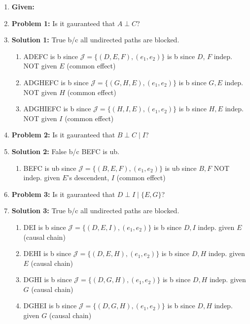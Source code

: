 \begin{example}
    \begin{enumerate}
        \item \textbf{Given:}
        \item \textbf{Problem 1:} Is it gauranteed that $A \perp C$?
        \item \textbf{Solution 1:} True b/c all undirected paths are blocked.
        \begin{enumerate}
            \item ADEFC is b since $\mathcal{J} = \{(D,E,F),(e_1,e_2)\}$ is b since $D$, $F$ indep. NOT given $E$ (common effect)
            \item ADGHEFC is b since $\mathcal{J} = \{(G,H,E),(e_1,e_2)\}$ is b since $G,E$ indep. NOT given $H$ (common effect)
            \item ADGHIEFC is b since $\mathcal{J} = \{(H,I,E),(e_1,e_2)\}$ is b since $H,E$ indep. NOT given $I$ (common effect)
        \end{enumerate}
        \item \textbf{Problem 2:} Is it gauranteed that $B \perp C \mid I$?
        \item \textbf{Solution 2:} False b/c BEFC is ub. 
        \begin{enumerate}
            \item BEFC is ub since $\mathcal{J} = \{(B,E,F),(e_1,e_2)\}$ is ub since $B,F$ NOT indep. given $E$'s descendent, $I$ (common effect)
        \end{enumerate}
        \item \textbf{Problem 3:} Is it gauranteed that $D \perp I \mid \{E,G\}$?
        \item \textbf{Solution 3:} True b/c all undirected paths are blocked.
        \begin{enumerate}
            \item DEI is b since $\mathcal{J} = \{(D,E,I),(e_1,e_2)\}$ is b since $D,I$ indep. given $E$ (causal chain)
            \item DEHI is b since $\mathcal{J} = \{(D,E,H),(e_1,e_2)\}$ is b since $D,H$ indep. given $E$ (causal chain)
            \item DGHI is b since $\mathcal{J} = \{(D,G,H),(e_1,e_2)\}$ is b since $D,H$ indep. given $G$ (causal chain)
            \item DGHEI is b since $\mathcal{J} = \{(D,G,H),(e_1,e_2)\}$ is b since $D,H$ indep. given $G$ (causal chain)
        \end{enumerate}

\end{enumerate}
\end{example}
